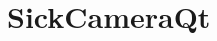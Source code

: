 \chapter{Sick\+Camera\+Qt}
\hypertarget{md__r_e_a_d_m_e}{}\label{md__r_e_a_d_m_e}
\label{md__r_e_a_d_m_e_autotoc_md0}%
%
